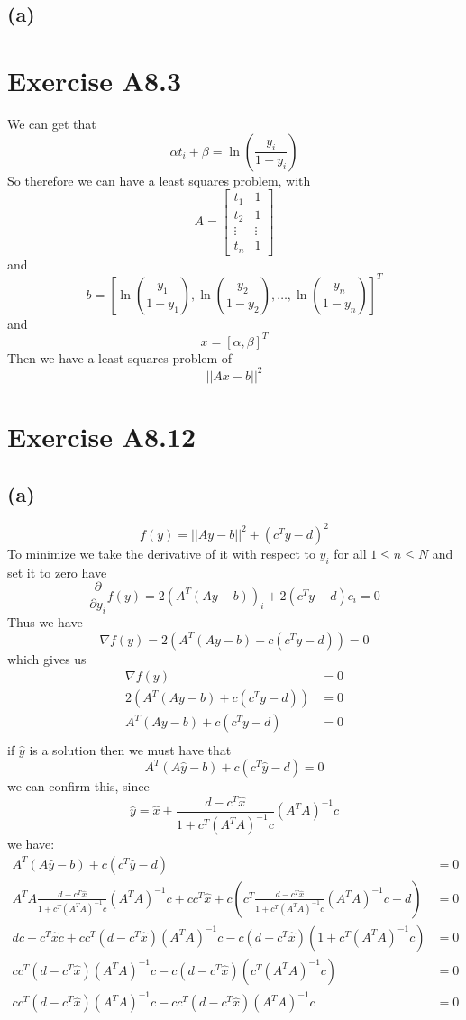 \subsection*{(a)}
\section*{Exercise A8.3}
We can get that 
$$\alpha t_i+\beta=\ln(\frac{y_i}{1-y_i})$$
So therefore we can have a least squares problem, with
$$A=\begin{bmatrix}
t_1 & 1\\
t_2 & 1\\
\vdots & \vdots\\
t_n & 1
\end{bmatrix}$$
and 
$$b=[\ln(\frac{y_1}{1-y_1}),\ln(\frac{y_2}{1-y_2}),\dots,\ln(\frac{y_n}{1-y_n})]^T$$
and
$$x=[\alpha,\beta]^T$$
Then we have a least squares problem of 
$$||Ax-b||^2$$

\section*{Exercise A8.12}
\subsection*{(a)}
$$f(y)=||Ay-b||^2+(c^Ty-d)^2$$
To minimize we take the derivative of it with respect to $y_i$ for all
$1\leq n \leq N$ and set it to zero have
$$\frac{\partial}{\partial y_i} f(y)=2(A^T(Ay-b))_i+2(c^Ty-d)c_i=0$$
Thus we have 
$$\nabla f(y)=2(A^T(Ay-b)+c(c^Ty-d))=0$$
which gives us
\begin{align*}
    \nabla f(y)&=0\\
    2(A^T(Ay-b)+c(c^Ty-d))&=0\\
    A^T(Ay-b)+c(c^Ty-d)&=0\\
\end{align*}
if $\hat{y}$ is a solution then we must have that
$$A^T(A\hat{y}-b)+c(c^T\hat{y}-d)=0$$
we can confirm this, since 
$$\hat{y}=\hat{x}+\frac{d-c^T\hat{x}}{1+c^T(A^TA)^{-1}c}(A^TA)^{-1}c$$
we have:
\begin{align*}
    A^T(A\hat{y}-b)+c(c^T\hat{y}-d)&=0\\
    A^TA\frac{d-c^T\hat{x}}{1+c^T(A^TA)^{-1}c}(A^TA)^{-1}c+cc^T\hat{x}+c(c^T\frac{d-c^T\hat{x}}{1+c^T(A^TA)^{-1}c}(A^TA)^{-1}c-d)&=0\\
    dc-c^T\hat{x}c+cc^T(d-c^T\hat{x})(A^TA)^{-1}c-c(d-c^T\hat{x})(1+c^T(A^TA)^{-1}c)&=0\\
    cc^T(d-c^T\hat{x})(A^TA)^{-1}c-c(d-c^T\hat{x})(c^T(A^TA)^{-1}c)&=0\\
    cc^T(d-c^T\hat{x})(A^TA)^{-1}c-cc^T(d-c^T\hat{x})(A^TA)^{-1}c&=0
\end{align*}
